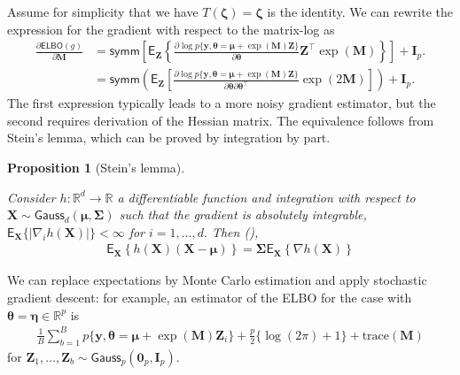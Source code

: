 \documentclass[
  11pt,
  letterpaper,
]{scrbook}
\theoremstyle{definition}
\theoremstyle{plain}
\newtheorem{proposition}{Proposition}[chapter]
\theoremstyle{plain}
\theoremstyle{plain}
\theoremstyle{definition}
\theoremstyle{definition}
\theoremstyle{plain}
\newtheorem{proposition}{Proposition}[chapter]
\theoremstyle{plain}
\theoremstyle{remark}
\begin{document}
Assume for simplicity that we have
\(T(\boldsymbol{\zeta}) = \boldsymbol{\zeta}\) is the identity. We can
rewrite the expression for the gradient with respect to the matrix-log
as \begin{align*}
 \frac{\partial \mathsf{ELBO}(g)}{\partial \mathbf{M}} &= \mathsf{symm}\left[ \mathsf{E}_{\boldsymbol{Z}}\left\{\frac{\partial \log p\{\boldsymbol{y}, \boldsymbol{\theta}=\boldsymbol{\mu} + \exp(\mathbf{M})\boldsymbol{Z}\}}{\partial \boldsymbol{\theta}}\boldsymbol{Z}^\top\exp(\mathbf{M})\right\}\right] + \mathbf{I}_p.
 \\& = \mathsf{symm}\left( \mathsf{E}_{\boldsymbol{Z}}\left[\frac{\partial \log p\{\boldsymbol{y}, \boldsymbol{\theta}=\boldsymbol{\mu} + \exp(\mathbf{M})\boldsymbol{Z}\}}{\partial \boldsymbol{\theta}\partial \boldsymbol{\theta}^\top}\exp(2\mathbf{M})\right]\right) + \mathbf{I}_p.
\end{align*} The first expression typically leads to a more noisy
gradient estimator, but the second requires derivation of the Hessian
matrix. The equivalence follows from Stein's lemma, which can be proved
by integration by part.

\begin{proposition}[Stein's
lemma]\protect\hypertarget{prp-stein-lemma}{}\label{prp-stein-lemma}

Consider \(h: \mathbb{R}^d \to \mathbb{R}\) a differentiable function
and integration with respect to
\(\boldsymbol{X} \sim \mathsf{Gauss}_d(\boldsymbol{\mu}, \boldsymbol{\Sigma})\)
such that the gradient is absolutely integrable,
\(\mathsf{E}_{\boldsymbol{X}}\{|\nabla_i h(\boldsymbol{X})|\} < \infty\)
for \(i=1, \ldots, d.\) Then (),
\begin{align*}
\mathsf{E}_{\boldsymbol{X}}\left\{h(\boldsymbol{X})(\boldsymbol{X}-\boldsymbol{\mu})\right\} = \boldsymbol{\Sigma}\mathsf{E}_{\boldsymbol{X}}\left\{\nabla h(\boldsymbol{X})\right\}
\end{align*}

\end{proposition}

We can replace expectations by Monte Carlo estimation and apply
stochastic gradient descent: for example, an estimator of the ELBO for
the case with
\(\boldsymbol{\theta} = \boldsymbol{\eta} \in \mathbb{R}^p\) is
\begin{align*}
\frac{1}{B}\sum_{b=1}^B p\{\boldsymbol{y}, \boldsymbol{\theta} = \boldsymbol{\mu} + \exp(\mathbf{M})\boldsymbol{Z}_i\} + \frac{p}{2}\{\log(2\pi)+1\} + \mathrm{trace}(\mathbf{M})
\end{align*} for
\(\boldsymbol{Z}_1, \ldots, \boldsymbol{Z}_b \sim \mathsf{Gauss}_p(\boldsymbol{0}_p, \mathbf{I}_p).\)
\end{document}
